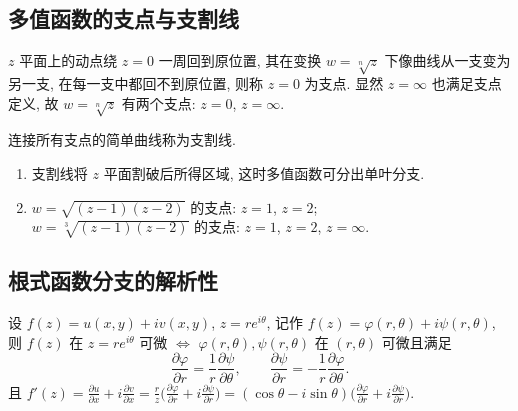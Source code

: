 \documentclass[theorem=false,mathfont=none,openany,sub3section]{easybook}
\begin{document}
\subsection{多值函数的支点与支割线}

\begin{definition}
  $z$ 平面上的动点绕 $z=0$ 一周回到原位置, 其在变换 $w=\sqrt[n]{z}$ 下像曲线从一支变为另一支, 在每一支中都回不到原位置, 则称 $z=0$ 为支点.
  显然 $z=\infty$ 也满足支点定义, 故 $w=\sqrt[n]{z}$ 有两个支点: $z=0$, $z=\infty$.
\end{definition}

\begin{definition}
  连接所有支点的简单曲线称为支割线.
\end{definition}

\begin{remark}
  \begin{enumerate}
    \item 支割线将 $z$ 平面割破后所得区域, 这时多值函数可分出单叶分支.
    \item $w=\sqrt{(z-1)(z-2)}$ 的支点: $z=1$, $z=2$;\\
    $w=\sqrt[3]{(z-1)(z-2)}$ 的支点: $z=1$, $z=2$, $z=\infty$.
  \end{enumerate}
\end{remark}

\subsection{根式函数分支的解析性}

\begin{theorem}
  设 $f(z)=u(x,y)+iv(x,y)$, $z=re^{i\theta}$,
  记作 $f(z)=\varphi(r,\theta)+i\psi(r,\theta)$, 则 $f(z)$ 在 $z=re^{i\theta}$ 可微
  $\Leftrightarrow$ $\varphi(r,\theta),\psi(r,\theta)$ 在 $(r,\theta)$ 可微且满足
  \[
  \frac{\partial\varphi}{\partial r}=\frac{1}{r}\frac{\partial\psi}{\partial\theta},\qquad
  \frac{\partial\psi}{\partial r}=-\frac{1}{r}\frac{\partial\varphi}{\partial\theta}.
  \]
  且 $f'(z)=\frac{\partial u}{\partial x}+i\frac{\partial v}{\partial x}
  =\frac{r}{z}\bigl(\frac{\partial\varphi}{\partial r}+i\frac{\partial\psi}{\partial r}\bigr)
  =(\cos\theta-i\sin\theta)\bigl(\frac{\partial\varphi}{\partial r}+i\frac{\partial\psi}{\partial r}\bigr)$.
\end{theorem}
\end{document}
